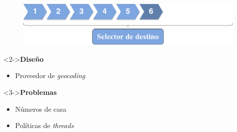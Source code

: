 \begin{slide}
  \begin{center}
    \begin{figure}[!h]
      \includegraphics[height=0.27\textheight]{img/ite6.png}
    \end{figure}
    \vspace{0.5cm}
    \begin{minipage}[b]{0.4\linewidth}
      \begin{block}<2->{\textbf{Diseño}}
        \begin{itemize}
          \item Proveedor de \emph{geocoding}
        \end{itemize}
      \end{block}
    \end{minipage}
    \hspace{0.5cm}
    \begin{minipage}[b]{0.4\linewidth}
      \begin{block}<3->{\textbf{Problemas}}
        \begin{itemize}
          \item Números de casa
          \item Políticas de \emph{threads}
        \end{itemize}
      \end{block}
    \end{minipage}
  \end{center}
\end{slide}

